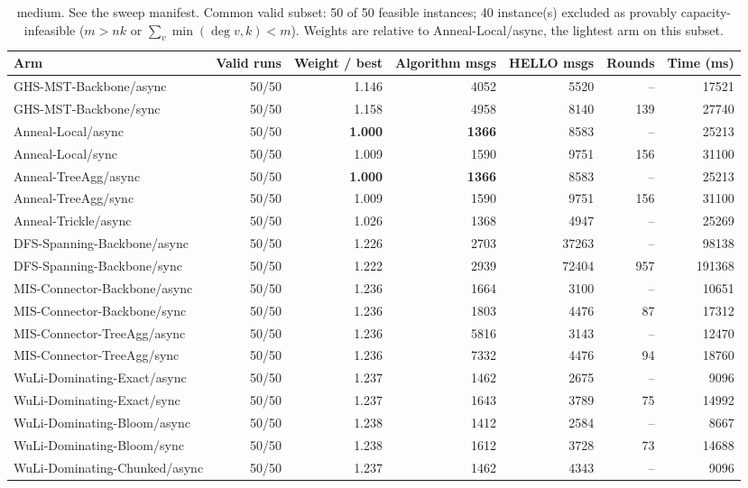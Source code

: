 \begin{table}[tb]
\centering
\caption{medium. See the sweep manifest. Common valid subset: 50 of 50 feasible instances; 40 instance(s) excluded as provably capacity-infeasible ($m > nk$ or $\sum_v \min(\deg v, k) < m$). Weights are relative to Anneal-Local/async, the lightest arm on this subset.}
\label{tab:cmp-medium}
\begin{tabular}{lrrrrrr}
\toprule
Arm & Valid runs & Weight / best & Algorithm msgs & HELLO msgs & Rounds & Time (ms) \\
\midrule
GHS-MST-Backbone/async & 50/50 & 1.146 & 4052 & 5520 & -- & 17521 \\
GHS-MST-Backbone/sync & 50/50 & 1.158 & 4958 & 8140 & 139 & 27740 \\
Anneal-Local/async & 50/50 & \textbf{1.000} & \textbf{1366} & 8583 & -- & 25213 \\
Anneal-Local/sync & 50/50 & 1.009 & 1590 & 9751 & 156 & 31100 \\
Anneal-TreeAgg/async & 50/50 & \textbf{1.000} & \textbf{1366} & 8583 & -- & 25213 \\
Anneal-TreeAgg/sync & 50/50 & 1.009 & 1590 & 9751 & 156 & 31100 \\
Anneal-Trickle/async & 50/50 & 1.026 & 1368 & 4947 & -- & 25269 \\
DFS-Spanning-Backbone/async & 50/50 & 1.226 & 2703 & 37263 & -- & 98138 \\
DFS-Spanning-Backbone/sync & 50/50 & 1.222 & 2939 & 72404 & 957 & 191368 \\
MIS-Connector-Backbone/async & 50/50 & 1.236 & 1664 & 3100 & -- & 10651 \\
MIS-Connector-Backbone/sync & 50/50 & 1.236 & 1803 & 4476 & 87 & 17312 \\
MIS-Connector-TreeAgg/async & 50/50 & 1.236 & 5816 & 3143 & -- & 12470 \\
MIS-Connector-TreeAgg/sync & 50/50 & 1.236 & 7332 & 4476 & 94 & 18760 \\
WuLi-Dominating-Exact/async & 50/50 & 1.237 & 1462 & 2675 & -- & 9096 \\
WuLi-Dominating-Exact/sync & 50/50 & 1.237 & 1643 & 3789 & 75 & 14992 \\
WuLi-Dominating-Bloom/async & 50/50 & 1.238 & 1412 & 2584 & -- & 8667 \\
WuLi-Dominating-Bloom/sync & 50/50 & 1.238 & 1612 & 3728 & 73 & 14688 \\
WuLi-Dominating-Chunked/async & 50/50 & 1.237 & 1462 & 4343 & -- & 9096 \\

\end{tabular}
\end{table}
